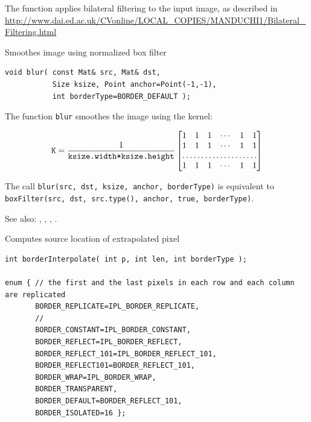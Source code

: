 The function applies bilateral filtering to the input image, as described in
\url{http://www.dai.ed.ac.uk/CVonline/LOCAL\_COPIES/MANDUCHI1/Bilateral\_Filtering.html}

\label{blur}
Smoothes image using normalized box filter

\begin{lstlisting}
void blur( const Mat& src, Mat& dst,
           Size ksize, Point anchor=Point(-1,-1),
           int borderType=BORDER_DEFAULT );
\end{lstlisting}
\begin{description}
\end{description}

The function \texttt{blur} smoothes the image using the kernel:

\[ \texttt{K} = \frac{1}{\texttt{ksize.width*ksize.height}}
\begin{bmatrix}
1 & 1 & 1 & \cdots & 1 & 1 \\
1 & 1 & 1 & \cdots & 1 & 1 \\
\hdotsfor{6} \\
1 & 1 & 1 & \cdots & 1 & 1 \\
\end{bmatrix}
\]

The call \texttt{blur(src, dst, ksize, anchor, borderType)} is equivalent to
\texttt{boxFilter(src, dst, src.type(), anchor, true, borderType)}.

See also: , , , .

\label{borderInterpolate}
Computes source location of extrapolated pixel

\begin{lstlisting}
int borderInterpolate( int p, int len, int borderType );

enum { // the first and the last pixels in each row and each column are replicated
       BORDER_REPLICATE=IPL_BORDER_REPLICATE,
       // 
       BORDER_CONSTANT=IPL_BORDER_CONSTANT,
       BORDER_REFLECT=IPL_BORDER_REFLECT,
       BORDER_REFLECT_101=IPL_BORDER_REFLECT_101,
       BORDER_REFLECT101=BORDER_REFLECT_101,
       BORDER_WRAP=IPL_BORDER_WRAP,
       BORDER_TRANSPARENT,
       BORDER_DEFAULT=BORDER_REFLECT_101,
       BORDER_ISOLATED=16 };
\end{lstlisting}
\begin{description}
\end{description}

